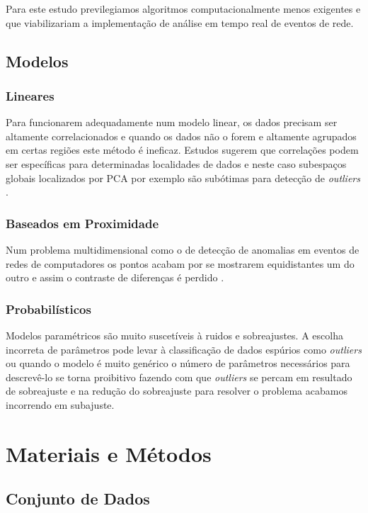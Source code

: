 \documentclass[twoside]{article}
\begin{document}
Para este estudo previlegiamos algoritmos computacionalmente menos exigentes e que viabilizariam a implementação de  análise em tempo real de eventos de rede.

\subsection{Modelos}

\subsubsection{Lineares}

Para funcionarem adequadamente num modelo linear, os dados precisam ser altamente correlacionados e quando os dados não o forem e altamente agrupados em certas regiões este método é ineficaz. Estudos sugerem que correlações podem ser específicas para determinadas localidades de dados e neste caso subespaços globais localizados por \gls{PCA} por exemplo são subótimas para detecção de \textit{outliers} \cite{aggarwal2000finding}.

\subsubsection{Baseados em Proximidade}

Num problema multidimensional como o de detecção de anomalias em eventos de redes de computadores os pontos acabam por se mostrarem equidistantes um do outro e assim o contraste de diferenças é perdido \cite{aggarwal2001surprising,hinneburg2000nearest}.

\subsubsection{Probabilísticos}

Modelos paramétricos são muito suscetíveis à ruidos e sobreajustes. A escolha incorreta de parâmetros pode levar à classificação de dados espúrios como \textit{outliers} ou quando o modelo é muito genérico o número de parâmetros necessários para descrevê-lo se torna proibitivo fazendo com que \textit{outliers} se percam em resultado de sobreajuste e na redução do sobreajuste para resolver o problema acabamos incorrendo em subajuste.

\section{Materiais e Métodos}

\subsection{Conjunto de Dados}
\end{document}
